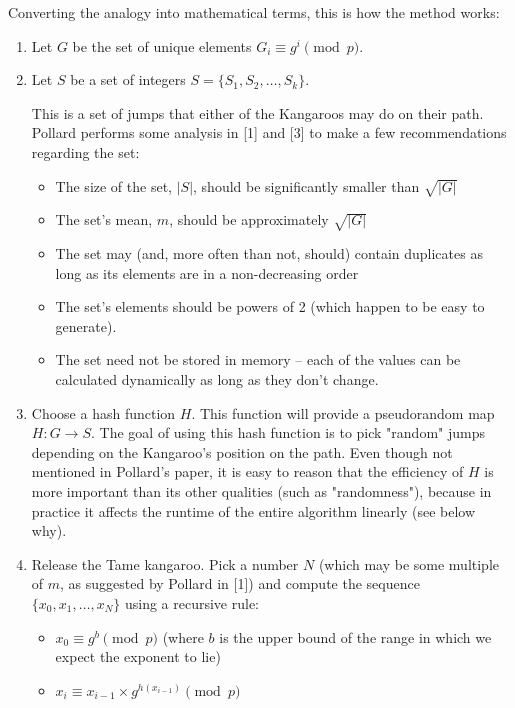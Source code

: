 \documentclass{article}
\begin{document}
    Converting the analogy into mathematical terms, this is how the method works:
    \begin{enumerate}
        \item Let $G$ be the set of unique elements $G_i \equiv g^i \pmod{p}$.

        \item Let $S$ be a set of integers $S = \{S_1, S_2, \ldots, S_k\}$.

        This is a set of jumps that either of the Kangaroos may do on their path. Pollard performs some analysis in [1] and [3] to make a few recommendations regarding the set:

        \begin{itemize}
            \item The size of the set, $|S|$, should be significantly smaller than $\sqrt{|G|}$
            \item The set's mean, $m$, should be approximately $\sqrt{|G|}$
            \item The set may (and, more often than not, should) contain duplicates as long as its elements are in a non-decreasing order
            \item The set's elements should be powers of 2 (which happen to be easy to generate).
            \item The set need not be stored in memory -- each of the values can be calculated dynamically as long as they don't change.
        \end{itemize}

        \item Choose a hash function $H$. This function will provide a pseudorandom map $H : G \to S$.
        The goal of using this hash function is to pick "random" jumps depending on the Kangaroo's position on the path. Even though not mentioned in Pollard's paper, it is easy to reason that the efficiency of $H$ is more important than its other qualities (such as "randomness"), because in practice it affects the runtime of the entire algorithm linearly (see below why).

        \item Release the Tame kangaroo. Pick a number $N$ (which may be some multiple of $m$, as suggested by Pollard in [1]) and compute the sequence $\{x_0, x_1, \ldots, x_N\}$ using a recursive rule:

        \begin{itemize}
            \item $x_0 \equiv g^b \pmod{p}$ (where $b$ is the upper bound of the range in which we expect the exponent to lie)
            \item $x_i \equiv x_{i-1} \times g^{h(x_{i-1})} \pmod{p}$
        \end{itemize}


\end{enumerate}
\end{document}
